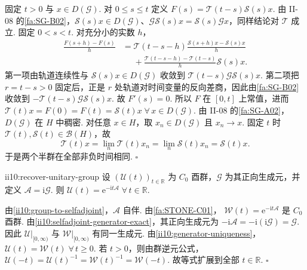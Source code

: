 \begin{FAProof}
固定 \(\displaystyle t>0\) 与 \(\displaystyle x\in D(\mathcal G)\). 对 \(\displaystyle0\leqslant s\leqslant t\) 定义 \(\displaystyle F(s)=\mathcal T(t-s)\mathcal S(s)x.\)
由 II-08 的\autoref{fa:SG-B02}，\(\displaystyle\mathcal S(s)x\in D(\mathcal G)\)、\(\displaystyle\mathcal G\mathcal S(s)x=\mathcal S(s)\mathcal Gx\)，同样结论对 \(\displaystyle\mathcal T\) 成立. 固定 \(\displaystyle0<s<t\). 对充分小的实数 \(\displaystyle h\)，
\[
\begin{aligned}
\displaystyle \frac{F(s+h)-F(s)}{h}
&\displaystyle =
\mathcal T(t-s-h)
\frac{\mathcal S(s+h)x-\mathcal S(s)x}{h}\\[12pt]
&\displaystyle \mathrel{\phantom{=}}+
\frac{\mathcal T(t-s-h)-\mathcal T(t-s)}{h}
\mathcal S(s)x.
\end{aligned}
\]
第一项由轨道连续性与 \(\displaystyle\mathcal S(s)x\in D(\mathcal G)\) 收敛到 \(\displaystyle\mathcal T(t-s)\mathcal G\mathcal S(s)x\). 第二项把 \(\displaystyle r=t-s>0\) 固定后，正是 \(\displaystyle r\) 处轨道对时间变量的反向差商，因此由\autoref{fa:SG-B02}收敛到 \(\displaystyle-\mathcal T(t-s)\mathcal G\mathcal S(s)x\). 故 \(\displaystyle F'(s)=0.\)
所以 \(\displaystyle F\) 在 \(\displaystyle[0,t]\) 上常值，进而 \(\displaystyle \mathcal T(t)x=F(0)=F(t)=\mathcal S(t)x \; \forall\,x\in D(\mathcal G).\)
由 II-08 的\autoref{fa:SG-A02}，\(\displaystyle D(\mathcal G)\) 在 \(\displaystyle H\) 中稠密. 对任意 \(\displaystyle x\in H\)，取 \(\displaystyle x_n\in D(\mathcal G)\) 且 \(\displaystyle x_n\to x\). 固定 \(\displaystyle t\) 时 \(\displaystyle\mathcal T(t),\mathcal S(t)\in\mathcal B(H)\)，故
\[
\mathcal T(t)x
=
\lim_n\mathcal T(t)x_n
=
\lim_n\mathcal S(t)x_n
=
\mathcal S(t)x.
\]
于是两个半群在全部非负时间相同.
\hfill\(\square\)
\end{FAProof}

\begin{FAProposition}[B][由生成元恢复原酉群]{ii10:recover-unitary-group}
设 \(\displaystyle(\mathcal U(t))_{t\in\mathbb R}\) 为 \(\displaystyle C_0\) 酉群，\(\displaystyle\mathcal G\) 为其正向生成元，并定义 \(\displaystyle\mathcal A=\mathrm{i}\mathcal G\). 则 \(\displaystyle \mathcal U(t)=\mathrm{e}^{-\mathrm{i}t\mathcal A} \; \forall\,t\in\mathbb R.\)
\end{FAProposition}

\begin{FAProof}
由\autoref{ii10:group-to-selfadjoint}，\(\displaystyle\mathcal A\) 自伴. 由\autoref{fa:STONE-C01}， \(\displaystyle \mathcal W(t)=\mathrm{e}^{-\mathrm{i}t\mathcal A}\)
是 \(\displaystyle C_0\) 酉群. 由\autoref{ii10:selfadjoint-generator-exact}，其正向生成元为 \(\displaystyle -\mathrm{i}\mathcal A = -\mathrm{i}(\mathrm{i}\mathcal G) = \mathcal G.\)
因此 \(\displaystyle\mathcal U|_{[0,\infty)}\) 与 \(\displaystyle\mathcal W|_{[0,\infty)}\) 有同一生成元. 由\autoref{ii10:generator-uniqueness}， \(\displaystyle \mathcal U(t)=\mathcal W(t) \; \forall\,t\geqslant0.\)
若 \(\displaystyle t>0\)，则由群逆元公式， \(\displaystyle \mathcal U(-t) = \mathcal U(t)^{-1} = \mathcal W(t)^{-1} = \mathcal W(-t).\)
故等式扩展到全部 \(\displaystyle t\in\mathbb R\).
\hfill\(\square\)
\end{FAProof}

